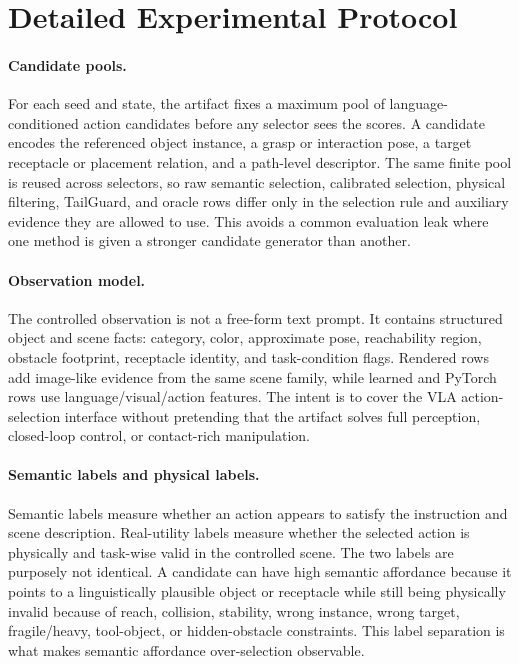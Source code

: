 \documentclass{article}
\begin{document}
\section{Detailed Experimental Protocol}
\label{app:protocol}

\paragraph{Candidate pools.}
For each seed and state, the artifact fixes a maximum pool of \VThreeCandidateBudget{} language-conditioned action candidates before any selector sees the scores. A candidate encodes the referenced object instance, a grasp or interaction pose, a target receptacle or placement relation, and a path-level descriptor. The same finite pool is reused across selectors, so raw semantic selection, calibrated selection, physical filtering, TailGuard, and oracle rows differ only in the selection rule and auxiliary evidence they are allowed to use. This avoids a common evaluation leak where one method is given a stronger candidate generator than another.

\paragraph{Observation model.}
The controlled observation is not a free-form text prompt. It contains structured object and scene facts: category, color, approximate pose, reachability region, obstacle footprint, receptacle identity, and task-condition flags. Rendered rows add image-like evidence from the same scene family, while learned and PyTorch rows use language/visual/action features. The intent is to cover the VLA action-selection interface without pretending that the artifact solves full perception, closed-loop control, or contact-rich manipulation.

\paragraph{Semantic labels and physical labels.}
Semantic labels measure whether an action appears to satisfy the instruction and scene description. Real-utility labels measure whether the selected action is physically and task-wise valid in the controlled scene. The two labels are purposely not identical. A candidate can have high semantic affordance because it points to a linguistically plausible object or receptacle while still being physically invalid because of reach, collision, stability, wrong instance, wrong target, fragile/heavy, tool-object, or hidden-obstacle constraints. This label separation is what makes semantic affordance over-selection observable.
\end{document}
